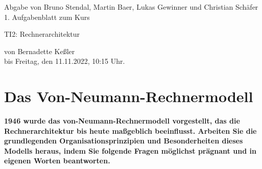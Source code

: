 \documentclass[11pt]{article}
\newcommand{\VORLESUNG}{TI2: Rechnerarchitektur}
\newcommand{\STUDENTS}{Bruno Stendal, Martin Baer, Lukas Gewinner und Christian Schäfer}
\newcommand{\STAFF}{Bernadette Keßler}
\newcommand{\ASSIGNMENT}{1}
\newcommand{\DELIVER}{Freitag, den 11.11.2022, 10:15 Uhr}
\newcommand{\aufgabe}[1]{\item{\bf #1}}
\begin{document}
\ofoot{\pagemark}
\begin{center}
    Abgabe von \STUDENTS{}\\
 \ASSIGNMENT{}. Aufgabenblatt  zum Kurs 
\vspace*{0.2cm}

{\Large \VORLESUNG{}}

{\small von \STAFF{} \\ bis \DELIVER{}.}
\vspace*{0.5cm}\\
\end{center}
\section{Das Von-Neumann-Rechnermodell}

\aufgabe{1946 wurde das von-Neumann-Rechnermodell vorgestellt, das die Rechnerarchitektur bis heute maßgeblich beeinflusst. Arbeiten Sie die grundlegenden Organisationsprinzipien und Besonderheiten dieses Modells heraus, indem Sie folgende Fragen möglichst prägnant und in eigenen Worten beantworten.}
\end{document}
